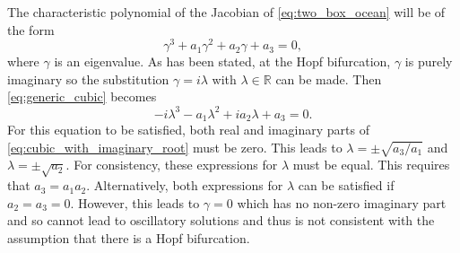 The characteristic polynomial of the Jacobian of \cref{eq:two_box_ocean} will be of the form
\begin{equation}
  \label{eq:generic_cubic}
  \gamma^3 + a_1 \gamma^2 + a_2 \gamma + a_3 = 0,
\end{equation}
where $\gamma$ is an eigenvalue. As has been stated, at the Hopf bifurcation, $\gamma$ is purely imaginary so the substitution $\gamma = i\lambda$ with $\lambda \in \mathbb{R}$
can be made. Then \cref{eq:generic_cubic} becomes
\begin{equation}
  \label{eq:cubic_with_imaginary_root}
  -i\lambda^3 - a_1 \lambda^2 + i a_2 \lambda + a_3 = 0. 
\end{equation}
For this equation to be satisfied, both real and imaginary parts of \cref{eq:cubic_with_imaginary_root} must be zero. This leads to
$\lambda = \pm \sqrt{a_3/a_1}$ and $\lambda = \pm \sqrt{a_2}$. For consistency, these expressions for $\lambda$ must be equal. This requires that $a_3 = a_1a_2$.
Alternatively, both expressions for $\lambda$ can be satisfied if $a_2 = a_3 = 0$. However, this leads to $\gamma = 0$ which has no non-zero imaginary part and so cannot lead to
oscillatory solutions and thus is not consistent with the assumption that there is a Hopf bifurcation.

